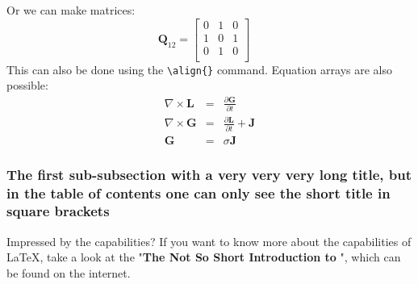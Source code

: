 				Or we can make matrices:
				\begin{equation}
				\mathbf{Q}_{12}=\left[\begin{array}{ccc}
		          0  &     1          &  0 \\
	            1  &     0          &  1 \\
	            0  &     1          &  0 \\
       	\end{array}\right]\quad
        \nonumber
		    \label{2eq1cf}
		    \end{equation}
		    This can also be done using the \verb"\align{}" command. Equation arrays are also possible:
     		\begin{eqnarray}
    		\label{2eq1e1}
	  \nabla\times\mathbf{L}  &=& \frac{\partial\mathbf{G}}{\partial t} \\
	    	\label{2eq1e2}
  	\nabla\times\mathbf{G}  &=& \frac{\partial\mathbf{L}}{\partial t} + \mathbf{J} \\
		    \label{2eq1e3}
    \mathbf{G}              &=& \sigma\mathbf{J}
		  \end{eqnarray}

       
        \subsubsection[Subsection Short Title]{The first sub-subsection with a very very very long title, but in the table of contents one can only see the short title in square brackets}

                Impressed by the capabilities? 
                If you want to know more about the capabilities of \LaTeX, take a look at the "\textbf{The Not So Short Introduction to \LaTeXe}", which can be found on the internet.

